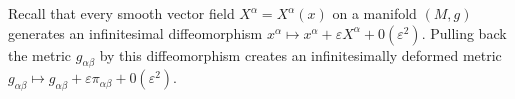 \documentclass[preview]{standalone}
\begin{document}
\begin{justify}
Recall that every smooth vector field $X^{\alpha}=X^{\alpha}(x)$ on a manifold $(M, g)$ generates an infinitesimal diffeomorphism $x^{\alpha}\mapsto x^{\alpha}+\varepsilon X^{\alpha}+0(\varepsilon^{2})$. Pulling back the metric $g_{\alpha\beta}$ by this diffeomorphism creates an infinitesimally deformed metric $g_{\alpha\beta}\mapsto g_{\alpha\beta}+\varepsilon \pi_{\alpha\beta}+0(\varepsilon^{2})$.
\end{justify}
\end{document}
